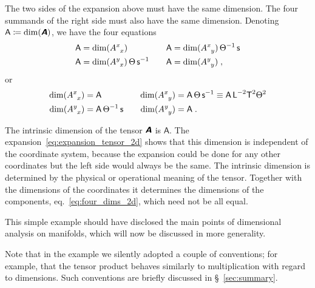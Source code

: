 \documentclass[\ifafour a4paper,12pt,\else a5paper,10pt,\fi%
onecolumn,oneside,article,%
british%
]{memoir}
\theoremstyle{remark}
\theoremstyle{innote}
\newcommand*{\mathte}[1]{\textbf{\textit{\textsf{#1}}}}
\newcommand*{\defd}{\coloneqq}
\renewcommand*{\|}[1][]{\nonscript\,#1\vert\nonscript\;\mathopen{}}
\newcommand*{\sect}{\S}%
\newcommand*{\eqn}{eq.}%
\newcommand*{\Un}{\textsf{1}}
\newcommand*{\Le}{\textsf{L}}
\newcommand*{\Ti}{\textsf{T}}
\newcommand*{\Ma}{\textsf{M}}
\newcommand*{\Te}{\Theta}
\newcommand*{\Ent}{\textsf{s}}
\newcommand*{\Aa}{\textsf{A}}
\newcommand*{\yA}{\mathte{A}}
\renewcommand*{\i}{\indices}
\begin{document}
The two sides of the expansion above must have the same dimension. The four
summands of the right side must also have the same dimension. Denoting
$\Aa \defd \dim(\yA)$, we have the four equations
\begin{equation*}
  \label{eq:four_dims_2d_pre}
  \begin{aligned}
    \Aa &= \dim(A\i{^{x}_{x}}) &\quad \Aa &=
 \dim(A\i{^{x}_{y}})\,\Te^{-1}\,\Ent 
 \\
    \Aa &= \dim(A\i{^{y}_{x}})\,\Te\,\Ent^{-1} &\quad \Aa &=
 \dim(A\i{^{y}_{y}}) \;,
  \end{aligned}
\end{equation*}
or
\begin{equation}
  \label{eq:four_dims_2d}
  \begin{aligned}
    \dim(A\i{^{x}_{x}}) &= \Aa\, &\quad 
 \dim(A\i{^{x}_{y}}) &=\Aa\,\Te\,\Ent^{-1} \equiv
\Aa\,\Le^{-2}\Ti^{2}\Te^{2}
    \\
    \dim(A\i{^{y}_{x}}) &= \Aa\,\Te^{-1}\,\Ent &\quad
 \dim(A\i{^{y}_{y}}) &= \Aa \;.
  \end{aligned}
\end{equation}

The intrinsic dimension of the tensor $\yA$ is $\Aa$. The
expansion~\eqref{eq:expansion_tensor_2d} shows that this dimension is
independent of the coordinate system, because the expansion could be done
for any other coordinates but the left side would always be the same. The
intrinsic dimension is determined by the physical or operational meaning of
the tensor. Together with the dimensions of the coordinates it determines
the dimensions of the components, \eqn~\eqref{eq:four_dims_2d}, which need
not be all equal.

This simple example should have disclosed the main points of dimensional
analysis on manifolds, which will now be discussed in more generality.

Note that in the example we silently adopted a couple of conventions; for
example, that the tensor product behaves similarly to multiplication with
regard to dimensions. Such conventions are briefly discussed in
\sect~\ref{sec:summary}.


\end{document}
